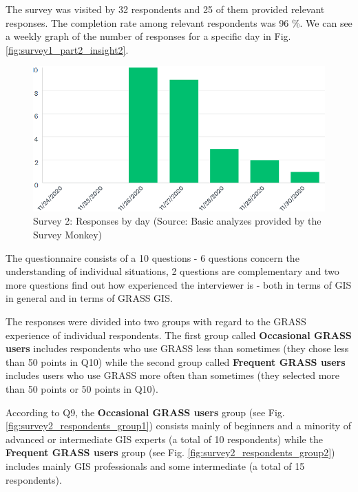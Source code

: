 \documentclass[a4paper,10pt,twoside]{article}
\begin{document}
\noindent The survey was visited by 32 respondents and 25 of them provided relevant responses. The completion rate among relevant respondents was 96 \%. We can see a weekly graph  of the number of responses for a specific day in Fig. \ref{fig:survey1_part2_insight2}.

\vspace{0.3cm}
\begin{figure}[hbt!] 
\begin{center}
\includegraphics[width=12cm]{../surveys/analyzed_data/survey2_insight2.png} 
\caption[Survey 2: Responses by day]{Survey 2: Responses by day (Source: Basic analyzes provided by the Survey Monkey)}
\label{fig:survey2_insight2}
\end{center}
\end{figure}

\noindent The questionnaire consists of a 10 questions - 6 questions concern the understanding of individual situations, 2 questions are complementary and two more questions find out how experienced the interviewer is - both in terms of GIS in general and in terms of GRASS GIS. 

The responses were divided into two groups with regard to the GRASS experience of individual respondents. The first group called \textbf{Occasional GRASS users} includes respondents who use GRASS less than sometimes (they chose less than 50 points in Q10) while the second group called \textbf{Frequent GRASS users} includes users who use GRASS more often than sometimes (they selected more than 50 points or 50 points in Q10). 

According to Q9, the \textbf{Occasional GRASS users} group (see Fig. \ref{fig:survey2_respondents_group1}) consists mainly of beginners and a minority of advanced or intermediate GIS experts (a total of 10 respondents) while the \textbf{Frequent GRASS users} group (see Fig. \ref{fig:survey2_respondents_group2}) includes mainly GIS professionals and some intermediate (a total of 15 respondents).
\end{document}
